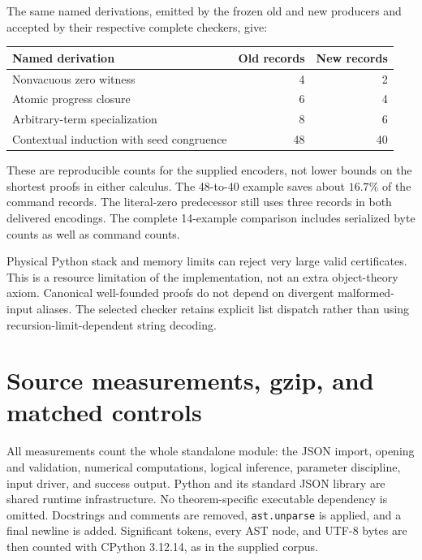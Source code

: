 \documentclass[11pt,letterpaper]{article}
\theoremstyle{definition}\newtheorem{definition}[theorem]{Definition}
\theoremstyle{remark}\newtheorem{remark}[theorem]{Remark}
\begin{document}
The same named derivations, emitted by the frozen old and new producers
and accepted by their respective complete checkers, give:
\begin{center}\small
\begin{tabular}{lrr}
\toprule
Named derivation & Old records & New records\\
\midrule
Nonvacuous zero witness &4&2\\
Atomic progress closure &6&4\\
Arbitrary-term specialization &8&6\\
Contextual induction with seed congruence &48&40\\
\bottomrule
\end{tabular}
\end{center}
These are reproducible counts for the supplied encoders, not lower bounds
on the shortest proofs in either calculus. The 48-to-40 example saves
about $16.7\%$ of the command records. The literal-zero predecessor still
uses three records in both delivered encodings. The complete 14-example
comparison includes serialized byte counts as well as command counts.

Physical Python stack and memory limits can reject very large valid
certificates. This is a resource limitation of the implementation, not an
extra object-theory axiom. Canonical well-founded proofs do not depend on
divergent malformed-input aliases. The selected checker retains explicit
list dispatch rather than using recursion-limit-dependent string decoding.

\section{Source measurements, gzip, and matched controls}
\label{sec:measurements}

All measurements count the whole standalone module: the JSON import,
opening and validation, numerical computations, logical inference,
parameter discipline, input driver, and success output. Python and its
standard JSON library are shared runtime infrastructure. No
theorem-specific executable dependency is omitted. Docstrings and comments
are removed, \texttt{ast.unparse} is applied, and a final newline is added.
Significant tokens, every AST node, and UTF-8 bytes are then counted with
CPython 3.12.14, as in the supplied corpus.
\end{document}
